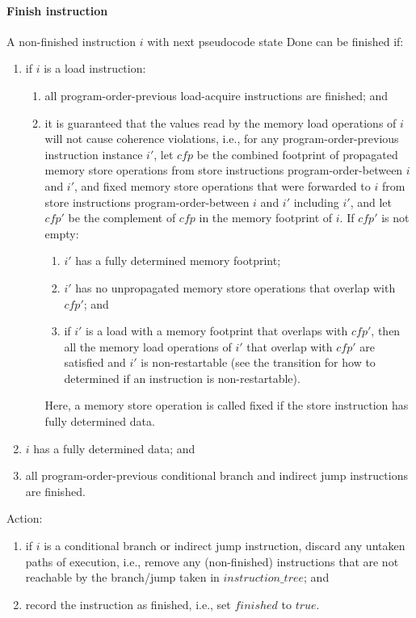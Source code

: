 \paragraph{Finish instruction}\label{omm:finish}
A non-finished instruction $i$ with next pseudocode state {\sc Done} can be finished if:
\begin{enumerate}
\item if $i$ is a load instruction:
  \begin{enumerate}
  \item all program-order-previous load-acquire instructions are finished; and
  \item it is guaranteed that the values read by the memory load operations of $i$ will not cause coherence violations, i.e., for any program-order-previous instruction instance $i'$, let $cfp$ be the combined footprint of propagated memory store operations from store instructions program-order-between $i$ and $i'$, and fixed memory store operations that were forwarded to $i$ from store instructions program-order-between $i$ and $i'$ including $i'$, and let $cfp'$ be the complement of $cfp$ in the memory footprint of $i$.
  If $cfp'$ is not empty:
    \begin{enumerate}
    \item $i'$ has a fully determined memory footprint;
    \item $i'$ has no unpropagated memory store operations that overlap with $cfp'$; and
    \item if $i'$ is a load with a memory footprint that overlaps with $cfp'$, then all the memory load operations of $i'$ that overlap with $cfp'$ are satisfied and $i'$ is non-restartable (see the  transition for how to determined if an instruction is non-restartable).
    \end{enumerate}
  Here, a memory store operation is called fixed if the store instruction has fully determined data.
  \end{enumerate}
\item $i$ has a fully determined data; and
\item all program-order-previous conditional branch and indirect jump instructions are finished.
\end{enumerate}
Action:
\begin{enumerate}
\item if $i$ is a conditional branch or indirect jump instruction, discard any untaken paths of execution, i.e., remove any (non-finished) instructions that are not reachable by the branch/jump taken in $instruction\_tree$; and
\item record the instruction as finished, i.e., set $finished$ to $true$.
\end{enumerate}


